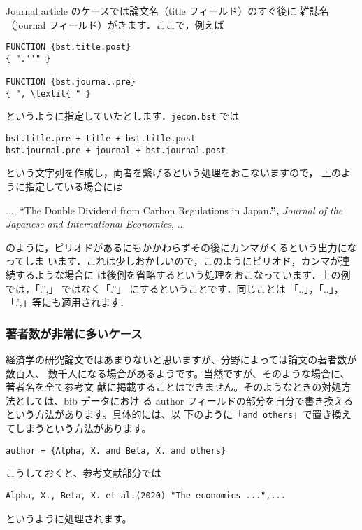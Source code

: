 \documentclass[a4j,10pt]{jarticle}
\begin{document}
Journal article のケースでは論文名（title フィールド）のすぐ後に
雑誌名（journal フィールド）がきます．ここで，例えば
\begin{screen}
\begin{verbatim}
FUNCTION {bst.title.post}
{ ".''" }

FUNCTION {bst.journal.pre}
{ ", \textit{ " }
\end{verbatim}
\end{screen}
というように指定していたとします．\texttt{jecon.bst} では
\begin{center}
\verb|bst.title.pre + title + bst.title.post| \\
\verb|bst.journal.pre + journal + bst.journal.post|
\end{center}
という文字列を作成し，両者を繋げるという処理をおこないますので，
上のように指定している場合には
\begin{flushleft}
 ..., ``The Double Dividend from Carbon Regulations in Japan\textbf{.'',} \textit{Journal of the Japanese and International Economies}, ...
\end{flushleft}
のように，ピリオドがあるにもかかわらずその後にカンマがくるという出力になってしま
います．これは少しおかしいので，このようにピリオド，カンマが連続するような場合に
は後側を省略するという処理をおこなっています．上の例では，「.'',」 ではなく「.''」
にするということです．同じことは 「.,」，「..」，「.',」等にも適用されます．

\subsubsection{著者数が非常に多いケース}

経済学の研究論文ではあまりないと思いますが、分野によっては論文の著者数が数百人、
数千人になる場合があるようです。当然ですが、そのような場合に、著者名を全て参考文
献に掲載することはできません。そのようなときの対処方法としては、bib データにおけ
る author フィールドの部分を自分で書き換えるという方法があります。具体的には、以
下のように「\texttt{and others}」で置き換えてしまうという方法があります。
\begin{screen}
\begin{verbatim}
author = {Alpha, X. and Beta, X. and others}
\end{verbatim}
\end{screen}
こうしておくと、参考文献部分では
\begin{screen}
\begin{verbatim}
Alpha, X., Beta, X. et al.(2020) "The economics ...",...
\end{verbatim}
\end{screen}
というように処理されます。
\end{document}
